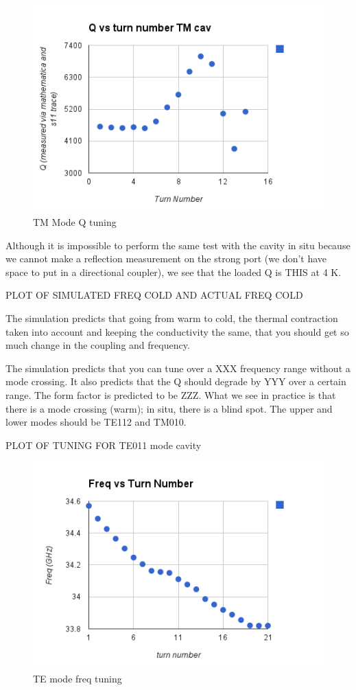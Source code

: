 \documentclass[11pt]{article}
\begin{document}
\begin{figure}
\includegraphics[scale=0.7]{TM_cav_Q_vs_turn_number}
\caption{TM Mode Q tuning}
\end{figure}


Although it is impossible to perform the same test with the cavity in situ because we cannot make a reflection measurement on the strong port (we don’t have space to put in a directional coupler), we see that the loaded Q is THIS at 4 K. 

PLOT OF SIMULATED FREQ COLD AND ACTUAL FREQ COLD

The simulation predicts that going from warm to cold, the thermal contraction taken into account and keeping the conductivity the same, that you should get so much change in the coupling and frequency.

The simulation predicts that you can tune over a XXX frequency range without a mode crossing. It also predicts that the Q should degrade by YYY over a certain range. The form factor is predicted to be ZZZ. What we see in practice is that there is a mode crossing (warm); in situ, there is a blind spot. The upper and lower modes should be TE112 and TM010.

PLOT OF TUNING FOR TE011 mode cavity
\begin{figure}
\includegraphics[scale=0.7]{freq_vs_turn_number}
\caption{TE mode freq tuning}
\end{figure}
\end{document}
